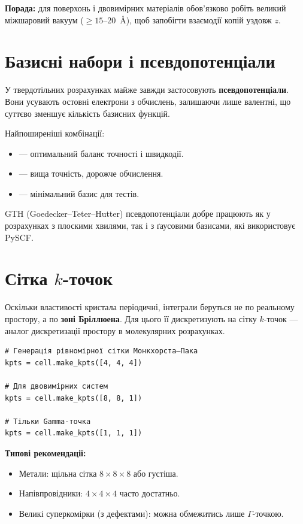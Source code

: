\textbf{Порада:} для поверхонь і двовимірних матеріалів обов’язково робіть великий міжшаровий вакуум ($\ge 15$–20~Å), щоб запобігти взаємодії копій уздовж $z$.

\section{Базисні набори і псевдопотенціали}

У твердотільних розрахунках майже завжди застосовують \textbf{псевдопотенціали}.
Вони усувають остовні електрони з обчислень, залишаючи лише валентні, що суттєво зменшує кількість базисних функцій.

Найпоширеніші комбінації:
\begin{itemize}
    \item {} --- оптимальний баланс точності і швидкодії.
    \item {} --- вища точність, дорожче обчислення.
    \item {} --- мінімальний базис для тестів.
\end{itemize}

GTH (Goedecker–Teter–Hutter) псевдопотенціали добре працюють як у розрахунках з плоскими хвилями, так і з ґаусовими базисами, які використовує PySCF.

\section{Сітка $k$-точок}

Оскільки властивості кристала періодичні, інтеграли беруться не по реальному простору, а по \textbf{зоні Бріллюена}.
Для цього її дискретизують на сітку $k$-точок --- аналог дискретизації простору в молекулярних розрахунках.

\begin{verbatim}
# Генерація рівномірної сітки Монкхорста–Пака
kpts = cell.make_kpts([4, 4, 4])

# Для двовимірних систем
kpts = cell.make_kpts([8, 8, 1])

# Тільки Gamma-точка
kpts = cell.make_kpts([1, 1, 1])
\end{verbatim}

\textbf{Типові рекомендації:}
\begin{itemize}
    \item Метали: щільна сітка $8\times8\times8$ або густіша.
    \item Напівпровідники: $4\times4\times4$ часто достатньо.
    \item Великі суперкомірки (з дефектами): можна обмежитись лише $\Gamma$-точкою.
\end{itemize}

